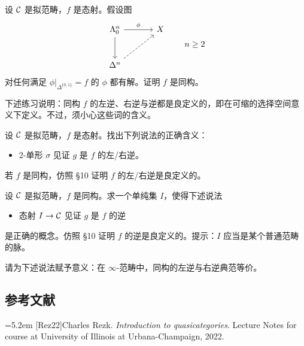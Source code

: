 \begin{exercise}\label{L4-A.2}
设 $\mathcal{C}$ 是拟范畴，$f$ 是态射。假设图
\[
\begin{tikzcd}[column sep=3.4em,row sep=2.6em]
\Lambda^n_0 \arrow[r, "\phi"] \arrow[d] & X \\
\Delta^n \arrow[ur, dashed] &
\end{tikzcd}
\qquad n\ge 2
\]
对任何满足 $\phi|_{\Delta^{\{0,1\}}}=f$ 的 $\phi$ 都有解。证明 $f$ 是同构。
\end{exercise}

\nitem\label{L4-A.3} 下述练习说明：同构 $f$ 的左逆、右逆与逆都是良定义的，即在可缩的选择空间意义下定义。不过，须小心这些词的含义。

\begin{exercise}\label{L4-A.4}
设 $\mathcal{C}$ 是拟范畴，$f$ 是态射。找出下列说法的正确含义：
\begin{itemize}[leftmargin=2.2em,itemsep=0.1em]
\item $2$-单形 $\sigma$ 见证 $g$ 是 $f$ 的左/右逆。
\end{itemize}
若 $f$ 是同构，仿照 \S10 证明 $f$ 的左/右逆是良定义的。
\end{exercise}

\begin{exercise}\label{L4-A.5}
设 $\mathcal{C}$ 是拟范畴，$f$ 是同构。求一个单纯集 $I$，使得下述说法
\begin{itemize}[leftmargin=2.2em,itemsep=0.1em]
\item 态射 $I\to\mathcal{C}$ 见证 $g$ 是 $f$ 的逆
\end{itemize}
是正确的概念。仿照 \S10 证明 $f$ 的逆是良定义的。提示：$I$ 应当是某个普通范畴的脉。
\end{exercise}

\begin{exercise}\label{L4-A.6}
请为下述说法赋予意义：在 $\infty$-范畴中，同构的左逆与右逆典范等价。
\end{exercise}

\subsection*{参考文献}
\par\noindent\hangindent=5.2em [Rez22]\hspace{0.6em}Charles Rezk. \emph{Introduction to quasicategories}. Lecture Notes for course at University of Illinois at Urbana-Champaign, 2022.
